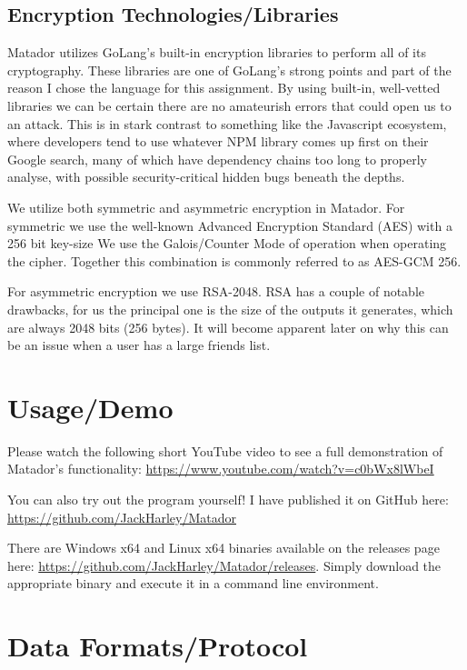 \documentclass{article}[12pt]
\begin{document}
	\subsection{Encryption Technologies/Libraries}
		Matador utilizes GoLang's built-in encryption libraries to perform all of its cryptography. These libraries are one of GoLang's strong points and part of the reason I chose the language for this assignment. By using built-in, well-vetted libraries we can be certain there are no amateurish errors that could open us to an attack. This is in stark contrast to something like the Javascript ecosystem, where developers tend to use whatever NPM library comes up first on their Google search, many of which have dependency chains too long to properly analyse, with possible security-critical hidden bugs beneath the depths.
		
		We utilize both symmetric and asymmetric encryption in Matador. For symmetric we use the well-known Advanced Encryption Standard (AES) with a 256 bit key-size We use the Galois/Counter Mode of operation when operating the cipher. Together this combination is commonly referred to as AES-GCM 256.
		
		For asymmetric encryption we use RSA-2048. RSA has a couple of notable drawbacks, for us the principal one is the size of the outputs it generates, which are always 2048 bits (256 bytes). It will become apparent later on why this can be an issue when a user has a large friends list.
	
	\section{Usage/Demo}
		Please watch the following short YouTube video to see a full demonstration of Matador's functionality: \url{https://www.youtube.com/watch?v=c0bWx8lWbeI}
		
		You can also try out the program yourself! I have published it on GitHub here: \url{https://github.com/JackHarley/Matador}
		
		There are Windows x64 and Linux x64 binaries available on the releases page here: \url{https://github.com/JackHarley/Matador/releases}. Simply download the appropriate binary and execute it in a command line environment.
	
	\newpage
	
	\section{Data Formats/Protocol}
	
\end{document}
